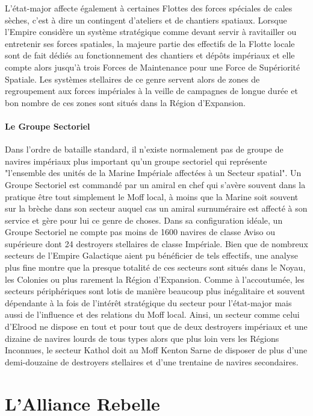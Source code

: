 \documentclass[twoside]{article}
\begin{document}
L'état-major affecte également à certaines Flottes des forces spéciales de cales sèches, c'est à dire un contingent d'ateliers et de chantiers spatiaux. Lorsque l'Empire considère un système stratégique comme devant servir à ravitailler ou entretenir ses forces spatiales, la majeure partie des effectifs de la Flotte locale sont de fait dédiés au fonctionnement des chantiers et dépôts impériaux et elle compte alors jusqu'à trois Forces de Maintenance pour une Force de Supériorité Spatiale. Les systèmes stellaires de ce genre servent alors de zones de regroupement aux forces impériales à la veille de campagnes de longue durée et bon nombre de ces zones sont situés dans la Région d'Expansion.

\paragraph{Le Groupe Sectoriel}
Dans l'ordre de bataille standard, il n'existe normalement pas de groupe de navires impériaux plus important qu'un groupe sectoriel qui représente "l'ensemble des unités de la Marine Impériale affectées à un Secteur spatial". Un Groupe Sectoriel est commandé par un amiral en chef qui s'avère souvent dans la pratique être tout simplement le Moff local, à moins que la Marine soit souvent sur la brèche dans son secteur auquel cas un amiral surnuméraire est affecté à son service et gère pour lui ce genre de choses.
Dans sa configuration idéale, un Groupe Sectoriel ne compte pas moins de 1600 navires de classe Aviso ou supérieure dont 24 destroyers stellaires de classe Impériale. Bien que de nombreux secteurs de l'Empire Galactique aient pu bénéficier de tels effectifs, une analyse plus fine montre que la presque totalité de ces secteurs sont situés dans le Noyau, les Colonies ou plus rarement la Région d'Expansion. Comme à l'accoutumée, les secteurs périphériques sont lotis de manière beaucoup plus inégalitaire et souvent dépendante à la fois de l'intérêt stratégique du secteur pour l'état-major mais aussi de l'influence et des relations du Moff local. Ainsi, un secteur comme celui d'Elrood ne dispose en tout et pour tout que de deux destroyers impériaux et une dizaine de navires lourds de tous types alors que plus loin vers les Régions Inconnues, le secteur Kathol doit au Moff Kenton Sarne de disposer de plus d'une demi-douzaine de destroyers stellaires et d'une trentaine de navires secondaires.


\section{L'Alliance Rebelle}
\end{document}
